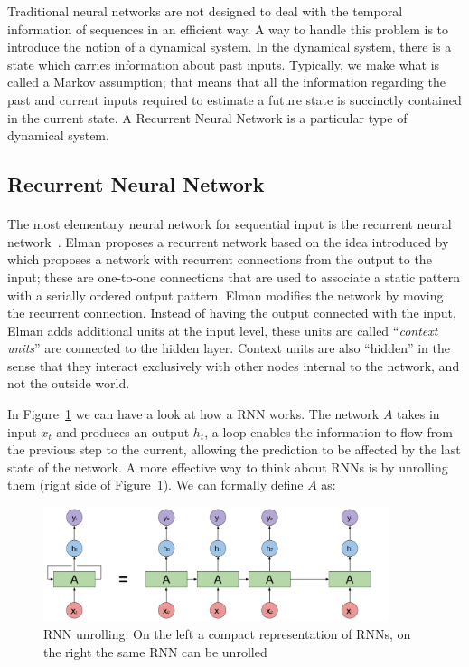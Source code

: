 Traditional neural networks are not designed to deal with the temporal information of sequences in an efficient way. A way to handle this problem is to introduce the notion of a dynamical system. In the dynamical system, there is a state which carries information about past inputs. Typically, we make what is called a Markov assumption; that means that all the information regarding the past and current inputs required to estimate a future state is succinctly contained in the current state. A Recurrent Neural Network is a particular type of dynamical system.

\subsection{Recurrent Neural Network}
\paragraph{}
The most elementary neural network for sequential input is the recurrent neural network~\citep{elman1990finding}. Elman proposes a recurrent network based on the idea introduced by~\citet{jordan1986} which proposes a network with recurrent connections from the output to the input; these are one-to-one connections that are used to associate a static pattern with a serially ordered output pattern. Elman modifies the network by moving the recurrent connection. Instead of having the output connected with the input, Elman adds additional units at the input level, these units are called ``\textit{context units}'' are connected to the hidden layer. Context units are also “hidden” in the sense that they interact exclusively with other nodes internal to the network, and not the outside world. 

In Figure~\ref{fig:rnn} we can have a look at how a RNN works. The network $A$ takes in input $x_t$ and produces an output $h_t$, a loop enables the information to flow from the previous step to the current, allowing the prediction to be affected by the last state of the network. A more effective way to think about RNNs is by unrolling them (right side of Figure~\ref{fig:rnn}). We can formally define $A$ as:

\begin{figure}[t]
        \centering
        \includegraphics[width=0.9\textwidth]{images/RNN_with_prediction.pdf}
        \caption{RNN unrolling. On the left a compact representation of RNNs, on the right the same RNN can be unrolled}
        \label{fig:rnn}
\end{figure}%

